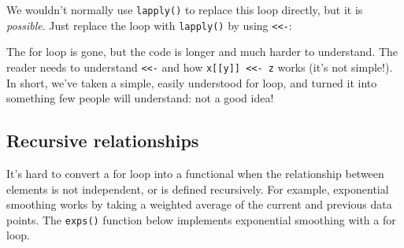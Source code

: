 \begin{Shaded}
\begin{Highlighting}[]
\StringTok{ }\NormalTok{(}
   \OperatorTok{*}\StringTok{ }\NormalTok{,}
    \NormalTok{(}\NormalTok{, }\NormalTok{))}
\NormalTok{)}
 
\StringTok{ }
\NormalTok{\}}
\end{Highlighting}
\end{Shaded}

We wouldn't normally use \texttt{lapply()} to replace this loop
directly, but it is \emph{possible}. Just replace the loop with
\texttt{lapply()} by using \texttt{\textless{}\textless{}-}:
\indexc{<<-}

\begin{Shaded}
\begin{Highlighting}[]
\NormalTok{(}
\StringTok{ }
\NormalTok{\})}
\end{Highlighting}
\end{Shaded}

The for loop is gone, but the code is longer and much harder to
understand. The reader needs to understand
\texttt{\textless{}\textless{}-} and how
\texttt{x{[}{[}y{]}{]}\ \textless{}\textless{}-\ z} works (it's not
simple!). In short, we've taken a simple, easily understood for loop,
and turned it into something few people will understand: not a good
idea!

\hypertarget{recursive-relationships}{%
\subsection{Recursive relationships}\label{recursive-relationships}}

It's hard to convert a for loop into a functional when the relationship
between elements is not independent, or is defined recursively. For
example, exponential smoothing works by taking a weighted average of the
current and previous data points. The \texttt{exps()} function below
implements exponential smoothing with a for loop.

